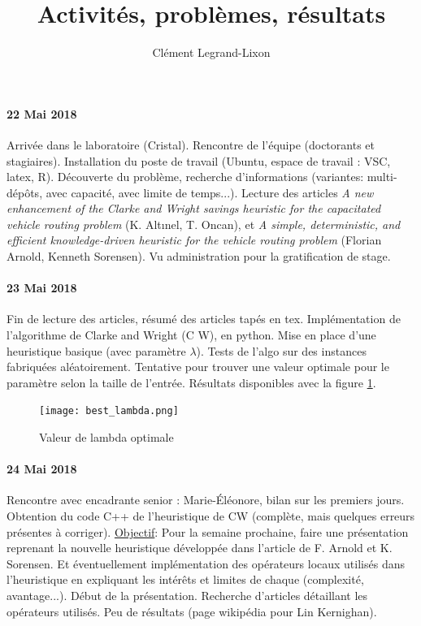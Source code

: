 \documentclass[a4paper,11pt]{article}%
\begin{document}
\title{Activités, problèmes, résultats}

\author{Clément Legrand-Lixon}

\date{}

\maketitle

\paragraph*{22 Mai 2018}

Arrivée dans le laboratoire (Cristal). Rencontre de l'équipe (doctorants et stagiaires). Installation du poste de travail (Ubuntu, espace de travail : VSC, latex, R). Découverte du problème, recherche d'informations (variantes: multi-dépôts, avec capacité, avec limite de temps...). Lecture des articles \emph{A new enhancement of the Clarke and Wright savings heuristic for the capacitated vehicle routing problem} (K. Altınel, T. Oncan), et \emph{A simple, deterministic, and efficient knowledge-driven heuristic
for the vehicle routing problem} (Florian Arnold, Kenneth Sorensen). Vu administration pour la gratification de stage. 

\paragraph*{23 Mai 2018}

Fin de lecture des articles, résumé des articles tapés en tex. Implémentation de l'algorithme de Clarke and Wright (C W), en python.
Mise en place d'une heuristique basique (avec paramètre $\lambda$). 
Tests de l'algo sur des instances fabriquées aléatoirement. 
Tentative pour trouver une valeur optimale pour le paramètre selon la taille de l'entrée. 
Résultats disponibles avec la figure \ref{lambda}.

\begin{figure}[ht]
	\centering
	\texttt{[image: best\_lambda.png]}
	\caption{Valeur de lambda optimale}
	\label{lambda}
\end{figure}

\paragraph*{24 Mai 2018}

Rencontre avec encadrante senior : Marie-Éléonore, bilan sur les premiers jours. Obtention du code C++ de l'heuristique de CW (complète, mais quelques erreurs présentes à corriger). 
\underline{Objectif}: Pour la semaine prochaine, faire une présentation reprenant la nouvelle heuristique développée dans l'article de F. Arnold et K. Sorensen. 
Et éventuellement implémentation des opérateurs locaux utilisés dans l'heuristique en expliquant les intérêts et limites de chaque (complexité, avantage...).  
Début de la présentation. Recherche d'articles détaillant les opérateurs utilisés. Peu de résultats (page wikipédia pour Lin Kernighan). 
\end{document}
